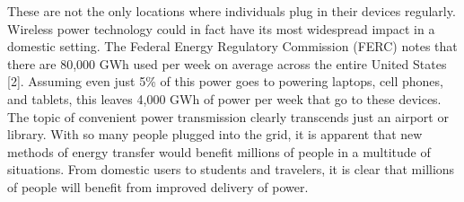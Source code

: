 These are not the only locations where individuals plug in their devices regularly. Wireless power technology could in fact have its most widespread impact in a domestic setting. The Federal Energy Regulatory Commission (FERC) notes that there are 80,000 GWh used per week on average across the entire United States [2]. Assuming even just 5\% of this power goes to powering laptops, cell phones, and tablets, this leaves 4,000 GWh of power per week that go to these devices. The topic of convenient power transmission clearly transcends just an airport or library. With so many people plugged into the grid, it is apparent that new methods of energy transfer would benefit millions of people in a multitude of situations. From domestic users to students and travelers, it is clear that millions of people will benefit from improved delivery of power.

